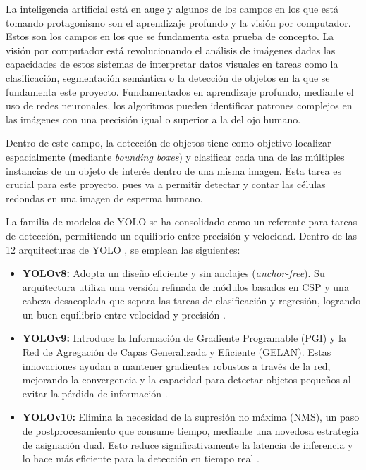 \documentclass[12pt,a4paper,onecolumn,oneside]{report}
\begin{document}
La inteligencia artificial está en auge y algunos de los campos en los que está tomando protagonismo son el aprendizaje profundo y la visión por computador. Estos son los campos en los que se fundamenta esta prueba de concepto.
La visión por computador está revolucionando el análisis de imágenes dadas las capacidades de estos sistemas de interpretar datos visuales en tareas como la clasificación, segmentación semántica o la detección de objetos en la que se fundamenta este proyecto.
Fundamentados en aprendizaje profundo, mediante el uso de redes neuronales, los algoritmos pueden identificar patrones complejos en las imágenes con una precisión igual o superior a la del ojo humano. 

Dentro de este campo, la detección de objetos tiene como objetivo localizar espacialmente (mediante \textit{bounding boxes}) y clasificar cada una de las múltiples instancias de un objeto de interés dentro de una misma imagen.
Esta tarea es crucial para este proyecto, pues va a permitir detectar y contar las células redondas en una imagen de esperma humano.

La familia de modelos de YOLO \cite{ultralytics_models} se ha consolidado como un referente para tareas de detección, permitiendo un equilibrio entre precisión y velocidad.
Dentro de las 12 arquitecturas de YOLO \cite{ultralytics_models}, se emplean las siguientes:

\begin{itemize}
  \item \textbf{YOLOv8:} Adopta un diseño eficiente y sin anclajes (\textit{anchor-free}). Su arquitectura utiliza una versión refinada de módulos basados en CSP y una cabeza desacoplada que separa las tareas de clasificación y regresión, logrando un buen equilibrio entre velocidad y precisión \cite{defyolos}.
  \item \textbf{YOLOv9:} Introduce la Información de Gradiente Programable (PGI) y la Red de Agregación de Capas Generalizada y Eficiente (GELAN). Estas innovaciones ayudan a mantener gradientes robustos a través de la red, mejorando la convergencia y la capacidad para detectar objetos pequeños al evitar la pérdida de información \cite{defyolos}.
  \item \textbf{YOLOv10:} Elimina la necesidad de la supresión no máxima (NMS), un paso de postprocesamiento que consume tiempo, mediante una novedosa estrategia de asignación dual. Esto reduce significativamente la latencia de inferencia y lo hace más eficiente para la detección en tiempo real \cite{defyolos}.
\end{itemize}
\end{document}
